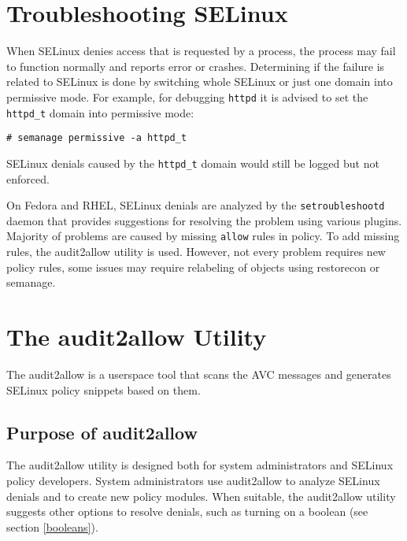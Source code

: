 \section{Troubleshooting SELinux}

When SELinux denies access that is requested by a process, the process may fail
to function normally and reports error or crashes. Determining if the failure is
related to SELinux is done by switching whole SELinux or just one domain into
permissive mode. For example, for debugging \texttt{httpd} it is advised to set
the \texttt{httpd\_t} domain into permissive mode:
\begin{lstlisting}
# semanage permissive -a httpd_t
\end{lstlisting}
SELinux denials caused by the \texttt{httpd\_t} domain would still be logged but
not enforced.

On Fedora and RHEL, SELinux denials are analyzed by the \texttt{setroubleshootd}
daemon that provides suggestions for resolving the problem using various
plugins. Majority of problems are caused by missing \texttt{allow} rules in
policy. To add missing rules, the audit2allow utility is used. However, not
every problem requires new policy rules, some issues may require relabeling of
objects using restorecon or semanage.

\section{The audit2allow Utility}
\label{audit2allow}
The audit2allow is a userspace tool that scans the AVC messages and generates
SELinux policy snippets based on them.

\subsection{Purpose of audit2allow}
The audit2allow utility is designed both for system administrators and SELinux
policy developers. System administrators use audit2allow to analyze SELinux
denials and to create new policy modules. When suitable, the audit2allow utility
suggests other options to resolve denials, such as turning on a boolean (see
section \ref{booleans}).

